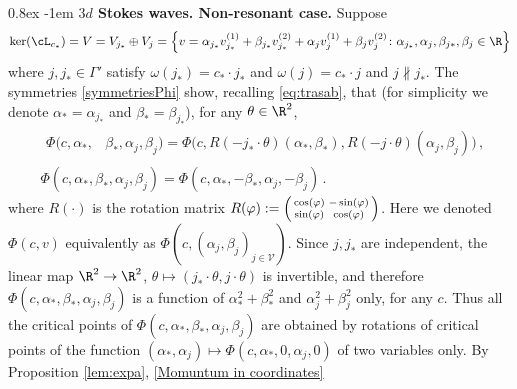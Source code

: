 \documentclass[11pt,a4paper,reqno]{article}
\makeatletter
\renewcommand{\paragraph}{%
  \@startsection{paragraph}{4}{\z@}%
  {0.8ex}  %
  {-1em}   %
  {\normalfont\bfseries}%
}
\numberwithin{equation}{section}
\theoremstyle{definition}
\makeatother
\begin{document}
\paragraph{\bf $3d$ Stokes waves. Non-resonant case.} \label{dim4R} 
Suppose 
\begin{equation}\label{casoNR}
\ker(\cL_{c_*}) = V = 
V_{j_*}
\oplus V_j = \Big\{ v=  \alpha_{j_*} v_{j_*}^{(1)} +
\beta_{j_*} v_{j_*}^{(2)} +
\alpha_{j} v_{j}^{(1)} +
\beta_{j} v_{j}^{(2)} \colon \alpha_{j_*}, \alpha_{j}, \beta_{j*}, \beta_{j} \in \R\Big\}
\end{equation}
where  
$ j, j_* \in \Gamma' $ satisfy 
$ \omega(j_* )=c_*\cdot j_*  $
and 
$ \omega(j )=c_*\cdot j  $ and 
$j \not \parallel j_* $. 
The symmetries \eqref{symmetriesPhi} show,
recalling 
\eqref{eq:trasab}, that 
(for simplicity we denote
$ \alpha_* = \alpha_{j_*}$
and $ \beta_* = \beta_{j_*}$), for any  
$\theta \in \R^2 $, 
\begin{equation}\label{sim3dNR} 
\begin{aligned}
& \begin{aligned}
\Phi (c, \alpha_*, &\beta_*, \alpha_j, \beta_j ) = \Phi \Big( c,  
R(-j_* \cdot  \theta)(\alpha_*, \beta_* ),
R(-j \cdot \theta)(\alpha_j, \beta_j ) \Big) \, , 
\end{aligned} \\
&  \Phi (c, \alpha_*, \beta_*, 
\alpha_j, \beta_j) = \Phi (c,  \alpha_*, - \beta_*, \alpha_j, - \beta_j) \, .  
\end{aligned}
\end{equation}
where $R(\cdot)$ is the rotation matrix 
$
R(\varphi):=\begin{psmallmatrix}
        \cos(\varphi) & -\sin(\varphi)\\
        \sin(\varphi) & \cos(\varphi)
    \end{psmallmatrix}
$.
Here we  denoted  
$ \Phi (c, v) $ equivalently as 
$ \Phi (c, (\alpha_j,\beta_j)_{
j \in {\mathcal V}}) $.
Since $ j, j_* $ are independent,  the linear map
$ \R^2 \to \R^2 $, $ \theta \mapsto 
(j_* \cdot \theta, j \cdot \theta ) $
is invertible, and therefore 
$\Phi (c, \alpha_*, \beta_*, \alpha_j, \beta_j ) $
is  a function  of 
$ \alpha_*^2 + \beta_*^2 $ and  
$ \alpha_j^2 + \beta_j^2 $ only,  
for any $c $. Thus all the 
critical points of $ \Phi (c, \alpha_*, \beta_*, \alpha_j, \beta_j  ) $
 are 
obtained by rotations of  
critical points of the function 
$ (\alpha_*, \alpha_j) \mapsto 
 \Phi (c, \alpha_*, 0, \alpha_j, 0 )  $ 
of two variables only.  
By  Proposition \ref{lem:expa}, \eqref{Momuntum in coordinates}
\end{document}
